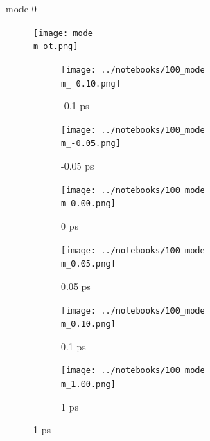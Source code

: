 \documentclass{beamer}
\newcommand\w{0.32}
\begin{document}

\newcommand\m{0}
\newcommand{\molwidth}{0.1}
\newcommand{\vh}{-10}

\iftrue

\begin{frame}{mode \m}
	\vspace{\vh mm}
	\begin{figure}
		\centering
		\texttt{[image: mode\\m\_ot.png]}
	\end{figure}
	\begin{figure}
		\centering
		\begin{subfigure}[b]{\w\textwidth}
			\centering
			\texttt{[image: ../notebooks/100\_mode\\m\_-0.10.png]}
			\caption{-0.1 ps}
			\label{fig:}
		\end{subfigure}
		\begin{subfigure}[b]{\w\textwidth}
			\centering
			\texttt{[image: ../notebooks/100\_mode\\m\_-0.05.png]}
			\caption{-0.05 ps}
			\label{fig:}
		\end{subfigure}
		\begin{subfigure}[b]{\w\textwidth}
			\centering
			\texttt{[image: ../notebooks/100\_mode\\m\_0.00.png]}
			\caption{0 ps}
			\label{fig:}
		\end{subfigure}
		\begin{subfigure}[b]{\w\textwidth}
			\centering
			\texttt{[image: ../notebooks/100\_mode\\m\_0.05.png]}
			\caption{0.05 ps}
			\label{fig:}
		\end{subfigure}
		\begin{subfigure}[b]{\w\textwidth}
			\centering
			\texttt{[image: ../notebooks/100\_mode\\m\_0.10.png]}
			\caption{0.1 ps}
			\label{fig:}
		\end{subfigure}
		\begin{subfigure}[b]{\w\textwidth}
			\centering
			\texttt{[image: ../notebooks/100\_mode\\m\_1.00.png]}
			\caption{1 ps}
			\label{fig:}
		\end{subfigure}
	\end{figure}
\end{frame}
\end{document}
